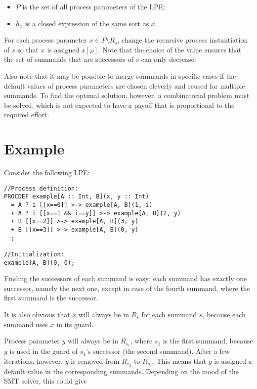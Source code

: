 \begin{enumerate}
\begin{itemize}
\item $P$ is the set of all process parameters of the LPE;
\item $h_x$ is a closed expression of the same sort as $x$.
\end{itemize}

For each process parameter $x \in P \setminus R_s$, change the recursive process instantiation of $s$ so that $x$ is assigned $x[\rho]$.
Note that the choice of the value ensures that the set of summands that are successors of $s$ can only decrease.

Also note that it may be possible to merge summands in specific cases if the default values of process parameters are chosen cleverly and reused for multiple summands.
To find the optimal solution, however, a combinatorial problem must be solved, which is not expected to have a payoff that is proportional to the required effort.

\end{enumerate}

\section{Example}

Consider the following LPE:

\begin{lstlisting}
//Process definition:
PROCDEF example[A :: Int, B](x, y :: Int)
  = A ? i [[x==0]] >-> example[A, B](1, i)
  + A ? i [[x==1 && i==y]] >-> example[A, B](2, y)
  + B [[x==2]] >-> example[A, B](3, y)
  + B [[x==3]] >-> example[A, B](0, y)
  ;

//Initialization:
example[A, B](0, 0);
\end{lstlisting}

Finding the successors of each summand is easy: each summand has exactly one successor, namely the next one, except in case of the fourth summand, where the first summand is the successor.

It is also obvious that $x$ will always be in $R_s$ for each summand $s$, because each summand uses $x$ in its guard.

Process parameter $y$ will always be in $R_{s_1}$, where $s_1$ is the first summand, because $y$ is used in the guard of $s_1$'s successor (the second summand).
After a few iterations, however, $y$ is removed from $R_{s_2}$ to $R_{s_4}$.
This means that $y$ is assigned a default value in the corresponding summands.
Depending on the mood of the SMT solver, this could give


